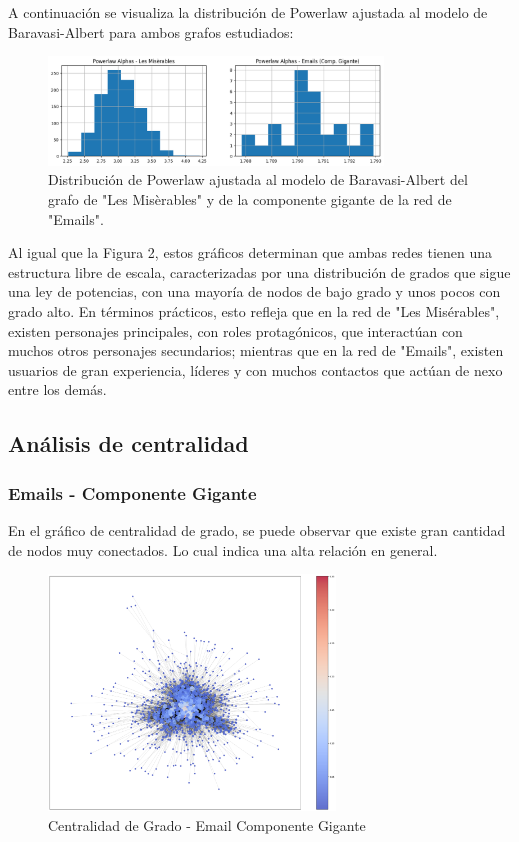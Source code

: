 \documentclass[conference]{IEEEtran}
\begin{document}
A continuación se visualiza la distribución de Powerlaw ajustada al modelo de Baravasi-Albert para ambos grafos estudiados:

\begin{figure}[h]
    \centering
    \includegraphics[width=3.5in]{img/powerlaw.png}
    \caption{Distribución de Powerlaw ajustada al modelo de Baravasi-Albert del grafo de "Les Misèrables" y de la componente gigante de la red de "Emails".}
    \label{fig:emails-avg_degree}
\end{figure}

Al igual que la Figura 2, estos gráficos determinan que ambas redes tienen una estructura libre de escala, caracterizadas por una distribución de grados que sigue una ley de potencias, con una mayoría de nodos de bajo grado y unos pocos con grado alto. En términos prácticos, esto refleja que en la red de "Les Misérables", existen personajes principales, con roles protagónicos, que interactúan con muchos otros personajes secundarios; mientras que en la red de "Emails", existen usuarios de gran experiencia, líderes y con muchos contactos que actúan de nexo entre los demás. 


\vspace{5pt}

\subsection{Análisis de centralidad}

\subsubsection{Emails - Componente Gigante}

En el gráfico de centralidad de grado, se puede observar que existe gran cantidad de nodos muy conectados. Lo cual indica una alta relación en general.

\begin{figure}[H]
    \centering
    \includegraphics[width=3in]{img/centralidad_emails_degrees_sping.png}
    \caption{Centralidad de Grado - Email Componente Gigante}
    \label{fig:degree_email}
\end{figure}
\end{document}
